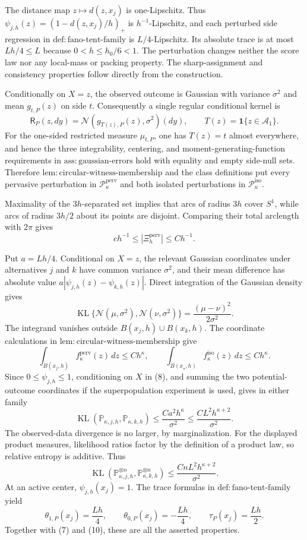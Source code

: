 The distance map \(z\mapsto d(z,x_j)\) is one-Lipschitz. Thus \(\psi_{j,h}(z)=(1-d(z,x_j)/h)_+\) is \(h^{-1}\)-Lipschitz, and each perturbed side regression in \(\mathrm{def:fano\text{-}tent\text{-}family}\) is \(L/4\)-Lipschitz. Its absolute trace is at most \(Lh/4\le L\) because \(0<h\le h_0/6<1\). The perturbation changes neither the score law nor any local-mass or packing property. The sharp-assignment and consistency properties follow directly from the construction.

Conditionally on \(X=z\), the observed outcome is Gaussian with variance \(\sigma^2\) and mean \(g_{t,P}(z)\) on side \(t\). Consequently a single regular conditional kernel is
\[
 \mathsf R_P(z,dy)=\mathcal N(g_{T(z),P}(z),\sigma^2)(dy),
 \qquad T(z)=\mathbf 1\{z\in\mathcal A_1\}.
\]
For the one-sided restricted measure \(\mu_{t,P}\), one has \(T(z)=t\) almost everywhere, and hence the three integrability, centering, and moment-generating-function requirements in \(\mathrm{ass:gaussian\text{-}errors}\) hold with equality and empty side-null sets. Therefore \(\mathrm{lem:circular\text{-}witness\text{-}membership}\) and the class definitions put every pervasive perturbation in \(\mathcal P_{\kappa}^{\mathrm{perv}}\) and both isolated perturbations in \(\mathcal P_{\kappa}^{\mathrm{iso}}\).

Maximality of the \(3h\)-separated set implies that arcs of radius \(3h\) cover \(S^1\), while arcs of radius \(3h/2\) about its points are disjoint. Comparing their total arclength with \(2\pi\) gives
\[
 c h^{-1}\le |\Xi_h^{\mathrm{perv}}|\le C h^{-1}. \tag{7}
\]

Put \(a=Lh/4\). Conditional on \(X=z\), the relevant Gaussian coordinates under alternatives \(j\) and \(k\) have common variance \(\sigma^2\), and their mean difference has absolute value \(a|\psi_{j,h}(z)-\psi_{k,h}(z)|\). Direct integration of the Gaussian density gives
\[
 \operatorname{KL}\{\mathcal N(\mu,\sigma^2),\mathcal N(\nu,\sigma^2)\}
 =\frac{(\mu-\nu)^2}{2\sigma^2}. \tag{8}
\]
The integrand vanishes outside \(B(x_j,h)\cup B(x_k,h)\). The coordinate calculations in \(\mathrm{lem:circular\text{-}witness\text{-}membership}\) give
\[
 \int_{B(x_j,h)}f_{\kappa}^{\mathrm{perv}}(z)\,dz\le Ch^{\kappa},
 \qquad
 \int_{B(x_{\star},h)}f_{\kappa}^{\mathrm{iso}}(z)\,dz\le Ch^{\kappa}.
\]
Since \(0\le\psi_{j,h}\le1\), conditioning on \(X\) in (8), and summing the two potential-outcome coordinates if the superpopulation experiment is used, gives in either family
\[
 \operatorname{KL}(\mathbb P_{\kappa,j,h},\mathbb P_{\kappa,k,h})
 \le \frac{Ca^2h^{\kappa}}{\sigma^2}
 \le \frac{CL^2h^{\kappa+2}}{\sigma^2}. \tag{9}
\]
The observed-data divergence is no larger, by marginalization. For the displayed product measures, likelihood ratios factor by the definition of a product law, so relative entropy is additive. Thus
\[
 \operatorname{KL}(\mathbb P_{\kappa,j,h}^{\otimes n},
 \mathbb P_{\kappa,k,h}^{\otimes n})
 \le \frac{CnL^2h^{\kappa+2}}{\sigma^2}. \tag{10}
\]
At an active center, \(\psi_{j,h}(x_j)=1\). The trace formulas in \(\mathrm{def:fano\text{-}tent\text{-}family}\) yield
\[
 \theta_{1,P}(x_j)=\frac{Lh}{4},\qquad
 \theta_{0,P}(x_j)=-\frac{Lh}{4},\qquad
 \tau_P(x_j)=\frac{Lh}{2}.
\]
Together with (7) and (10), these are all the asserted properties.